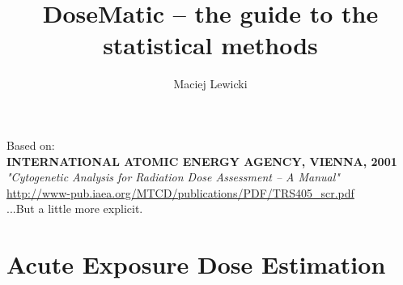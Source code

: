 \documentclass[a4paper,11pt]{article}
\author{Maciej Lewicki}
\title{DoseMatic -- the guide to the statistical methods}
\begin{document}
\newcommand{\va}{\vspace{10pt}}
\newcommand{\vb}{\vspace{ 3pt}}

\maketitle
\vspace{1cm}
Based on:\\
\textbf{INTERNATIONAL ATOMIC ENERGY AGENCY, VIENNA, 2001}\\
\textit{"Cytogenetic Analysis for Radiation Dose Assessment -- A Manual"}\\
\url{http://www-pub.iaea.org/MTCD/publications/PDF/TRS405_scr.pdf}\va\\
...But a little more explicit.
\vspace{3cm}

\thispagestyle{empty}
\small{
\tableofcontents
}
\thispagestyle{plain}
\pagebreak

\part{Acute Exposure Dose Estimation}
\end{document}
